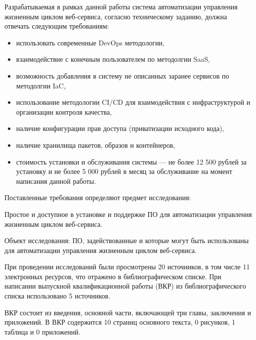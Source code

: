 Разрабатываемая в рамках данной работы система автоматизации управления жизненным циклом веб-сервиса,
согласно техническому заданию, должна отвечать следующим требованиям:

\begin{itemize}
    \item использовать современные DevOps методологии,
    \item взаимодействие с конечным пользователем по методолгии SaaS,
    \item возможность добавления в систему не описанных заранее сервисов по методолгии IaC,
    \item использование методологии CI/CD для взаимодействия с инфраструктурой и организации контроля качества,
    \item наличие конфигурации прав доступа (приватизации исходного кода),
    \item наличие хранилища пакетов, образов и контейнеров,
    \item стоимость установки и обслуживания системы --- не более 12 500 рублей за установку и не более 5 000 рублей в месяц за обслуживание на момент написания данной работы.
\end{itemize}

Поставленные требования определяют предмет исследования:

Простое и доступное в установке и поддержке ПО для автоматизации управления жизненным циклом веб-сервиса.

Объект исследования: ПО, задействованные и которые могут быть использованы для автоматизации управления жизненным циклом веб-сервиса.

При проведении исследований были просмотрены 20 источников, в том числе 11 электронных ресурсов, что отражено в библиографическом списке.
При написании выпускной квалификационной работы (ВКР) из библиографического списка использовано 5 источников.

ВКР состоит из введения, основной части, включающей три главы, заключения и приложений.
В ВКР содержится 10 страниц основного текста, 0 рисунков, 1 таблица и 0 приложений.